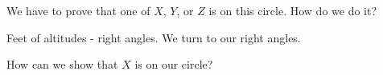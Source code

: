 

We have to prove that one of $X$, $Y$, or $Z$ is on this circle. How do we do it?




Feet of altitudes - right angles. We turn to our right angles.



How can we show that $X$ is on our circle?









